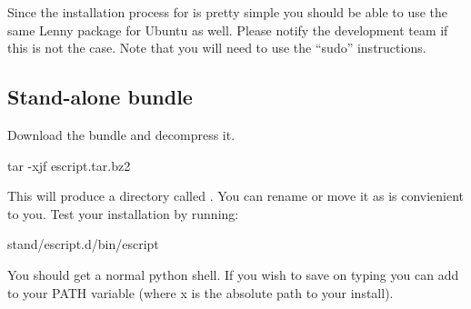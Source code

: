 Since the installation process for \esfinley is pretty simple you should be able to use the same Lenny package for Ubuntu as well.
Please notify the development team if this is not the case.
Note that you will need to use the ``sudo'' instructions.


\subsection{Stand-alone bundle}

Download the bundle and decompress it.
\begin{shellCode}
tar -xjf escript.tar.bz2 
\end{shellCode}
This will produce a directory called . 
You can rename or move it as is convienient to you.
Test your installation by running:
\begin{shellCode}
 stand/escript.d/bin/escript
\end{shellCode}
You should get a normal python shell.
If you wish to save on typing you can add  to your PATH variable (where x is the absolute path to your install). 




